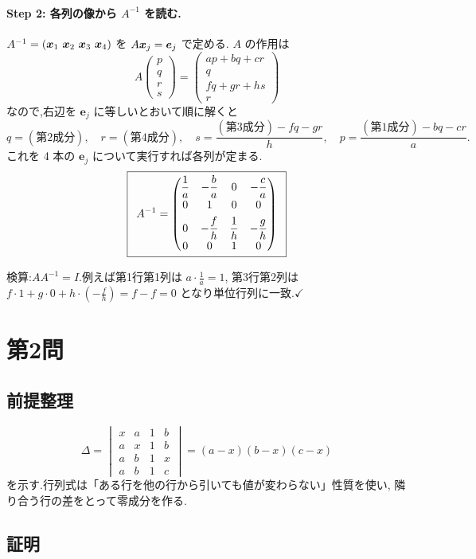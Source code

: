 \documentclass[11pt,a4paper]{article}
\begin{document}
\paragraph{Step 2: 各列の像から $A^{-1}$ を読む.}
$A^{-1}=(\vx_1\ \vx_2\ \vx_3\ \vx_4)$ を $A\bm{x}_j=\bm{e}_j$ で定める.
$A$ の作用は
\[
A\begin{pmatrix}p\\q\\r\\s\end{pmatrix}
=\begin{pmatrix}ap+bq+cr\\ q\\ fq+gr+hs\\ r\end{pmatrix}
\]
なので,右辺を $\bm{e}_j$ に等しいとおいて順に解くと
\[
q=(\text{第2成分}),\quad r=(\text{第4成分}),\quad
s=\frac{(\text{第3成分})-fq-gr}{h},\quad
p=\frac{(\text{第1成分})-bq-cr}{a}.
\]
これを 4 本の $\bm{e}_j$ について実行すれば各列が定まる.
\[
\boxed{\,\
A^{-1}=\begin{pmatrix}
\dfrac{1}{a}&-\dfrac{b}{a}&0&-\dfrac{c}{a}\\[4pt]
0&1&0&0\\[4pt]
0&-\dfrac{f}{h}&\dfrac{1}{h}&-\dfrac{g}{h}\\[4pt]
0&0&1&0
\end{pmatrix}\ \,}
\]

検算:$A A^{-1}=I$.例えば第1行第1列は $a\cdot\frac1a=1$,
第3行第2列は $f\cdot1+g\cdot0+h\cdot(-\frac fh)=f-f=0$ となり単位行列に一致.$\checkmark$

\section*{第2問}

\subsection*{前提整理}

\[
\Delta=\begin{vmatrix}x&a&1&b\\a&x&1&b\\a&b&1&x\\a&b&1&c\end{vmatrix}
=(a-x)(b-x)(c-x)
\]
を示す.行列式は「ある行を他の行から引いても値が変わらない」性質を使い,
隣り合う行の差をとって零成分を作る.

\subsection*{証明}
\end{document}
